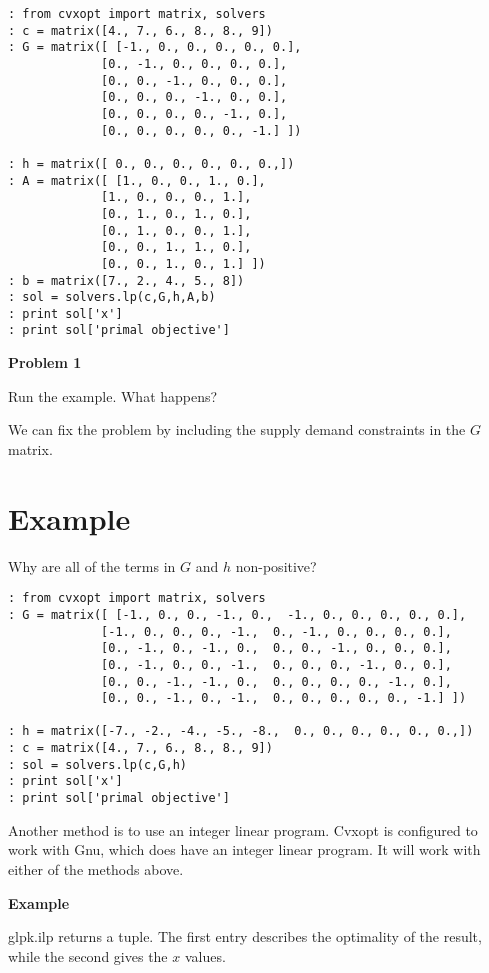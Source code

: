 \begin{lstlisting}
: from cvxopt import matrix, solvers
: c = matrix([4., 7., 6., 8., 8., 9])
: G = matrix([ [-1., 0., 0., 0., 0., 0.],
             [0., -1., 0., 0., 0., 0.],
             [0., 0., -1., 0., 0., 0.],
             [0., 0., 0., -1., 0., 0.],
             [0., 0., 0., 0., -1., 0.],
             [0., 0., 0., 0., 0., -1.] ])
        
: h = matrix([ 0., 0., 0., 0., 0., 0.,])
: A = matrix([ [1., 0., 0., 1., 0.],
             [1., 0., 0., 0., 1.],
             [0., 1., 0., 1., 0.],
             [0., 1., 0., 0., 1.],
             [0., 0., 1., 1., 0.],
             [0., 0., 1., 0., 1.] ])
: b = matrix([7., 2., 4., 5., 8]) 
: sol = solvers.lp(c,G,h,A,b)  
: print sol['x']
: print sol['primal objective']
\end{lstlisting}

\textbf{Problem 1}

Run the example. What happens?


We can fix the problem by including the supply demand constraints in the $G$ matrix.

\section*{Example}
Why are all of the terms in $G$ and $h$ non-positive?

\begin{lstlisting}
: from cvxopt import matrix, solvers
: G = matrix([ [-1., 0., 0., -1., 0.,  -1., 0., 0., 0., 0., 0.],
             [-1., 0., 0., 0., -1.,  0., -1., 0., 0., 0., 0.],
             [0., -1., 0., -1., 0.,  0., 0., -1., 0., 0., 0.],
             [0., -1., 0., 0., -1.,  0., 0., 0., -1., 0., 0.],
             [0., 0., -1., -1., 0.,  0., 0., 0., 0., -1., 0.],
             [0., 0., -1., 0., -1.,  0., 0., 0., 0., 0., -1.] ])

: h = matrix([-7., -2., -4., -5., -8.,  0., 0., 0., 0., 0., 0.,])
: c = matrix([4., 7., 6., 8., 8., 9])
: sol = solvers.lp(c,G,h)
: print sol['x']
: print sol['primal objective']
\end{lstlisting}

Another method is to use an integer linear program. Cvxopt is configured to work with  Gnu, which does have an integer linear program. It will work with either of the methods above. 

\textbf{Example}

glpk.ilp returns a tuple. The first entry describes the optimality of the result, while the second gives the $x$ values.

